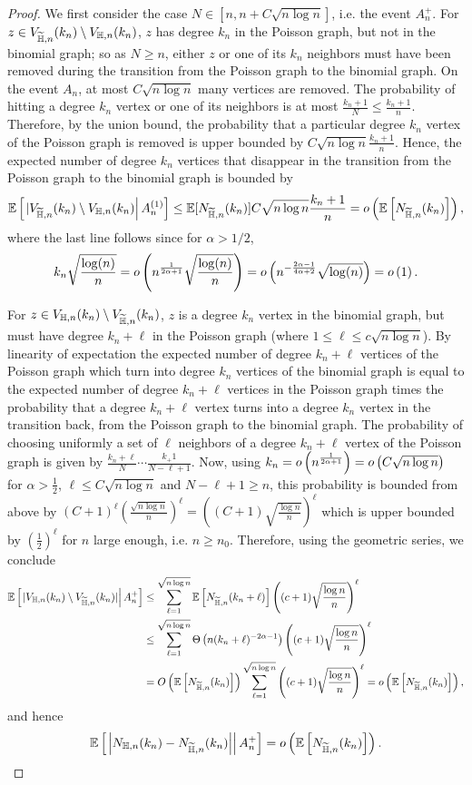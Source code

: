 \begin{proof}
We first consider the case $N \in [n,n+C\sqrt{n\log n}]$, i.e. the event $A_n^{+}$. For $z \in V_{\widetilde{\mathbb{H}},n}(k_n) \setminus V_{\mathbb{H},n}(k_n)$, $z$ has degree $k_n$ in the Poisson graph, but not in the binomial graph; so as $N \geq n$, either $z$ or one of its $k_n$ neighbors must have been removed during the transition from the Poisson graph to the binomial graph. On the event $A_n$, at most $C\sqrt{n\log n}$ many vertices are removed. The probability of hitting a degree $k_n$ vertex or one of its neighbors is at most $\frac{k_n+1}{N} \leq \frac{k_n+1}{n}$. Therefore, by the union bound, the probability that a particular degree $k_n$ vertex of the Poisson graph is removed is upper bounded by $C\sqrt{n\log n}\frac{k_n+1}{n}$. Hence, the expected number of degree $k_n$ vertices that disappear in the transition from the Poisson graph to the binomial graph is bounded by 
\[
	\mathbb{E}\left[\left.|V_{\widetilde{\mathbb{H}},n}(k_n) \setminus V_{\mathbb{H},n}(k_n)\right|A_n^{(1)}\right]\leq \mathbb{E}[N_{\widetilde{\mathbb{H}},n}(k_n)] C\sqrt{n \log n}\frac{k_n+1}{n}  
	= o\left(\mathbb{E}\left[N_{\widetilde{\mathbb{H}},n}(k_n)\right]\right),
\] 
where the last line follows since for $\alpha > 1/2$,
\[
	k_n \sqrt{\frac{\log(n)}{n}} = o\left(n^{\frac{1}{2\alpha + 1}}\sqrt{\frac{\log(n)}{n}}\right) 
	= o\left(n^{-\frac{2\alpha - 1}{4\alpha + 2}} \sqrt{\log(n)}\right) = o\left(1\right).
\]

For $z \in V_{\mathbb{H},n}(k_n) \setminus V_{\widetilde{\mathbb{H}},n}(k_n)$, $z$ is a degree $k_n$ vertex in the binomial graph, but 
must have degree $k_n+\ell$ in the Poisson graph (where $1 \leq \ell \leq c\sqrt{n\log n}$). By linearity of expectation the expected number of degree $k_n+\ell$ vertices of the Poisson graph which turn into degree $k_n$ vertices of the binomial graph is equal to the expected number of degree $k_n+\ell$ vertices in the Poisson graph times the probability that a degree $k_n+\ell$ vertex turns into a degree $k_n$ vertex in the transition back, from the Poisson graph to the binomial graph. The probability of choosing uniformly a set of $\ell$ neighbors of a degree $k_n+\ell$ vertex of the Poisson graph is given by $\frac{k_n+\ell}{N}\cdots \frac{k_+1}{N-\ell + 1}$. Now, using $k_n = o\left(n^{\frac{1}{2\alpha+1}}\right) = o\left(C\sqrt{n\log n}\right)$ for $\alpha > \frac{1}{2}$, $\ell \leq C\sqrt{n \log n}$ and $N-\ell + 1 \geq n$, this probability is bounded from above by $(C+1)^\ell (\frac{\sqrt{n \log n}}{n})^\ell =((C+1) \sqrt{\frac{\log n}{n}})^\ell$ which is upper bounded by $(\frac{1}{2})^\ell$ for $n$ large enough, i.e. $n \geq n_0$. Therefore, using the geometric series, we conclude
\begin{align*}
\mathbb{E}\left[\left.|V_{\mathbb{H},n}(k_n) \setminus V_{\widetilde{\mathbb{H}},n}(k_n)|\right|A_n^{+}\right] 
&\le  \sum_{\ell=1}^{\sqrt{n\log n}} \mathbb{E}\left[N_{\widetilde{\mathbb{H}},n}(k_n+\ell)\right] \left((c+1)\sqrt{\frac{\log n}{n}}\right)^{\ell}\\
&\le \sum_{\ell=1}^{\sqrt{n\log n}} \Theta\left(n (k_n+\ell)^{-2\alpha-1}\right) \left((c+1)\sqrt{\frac{\log n}{n}}\right)^{\ell}\\
&= O\left(\mathbb{E}\left[N_{\widetilde{\mathbb{H}},n}(k_n)\right]\right) \sum_{\ell=1}^{\sqrt{n\log n}} \left((c+1)\sqrt{\frac{\log n}{n}}\right)^{\ell}
= o\left(\mathbb{E}\left[N_{\widetilde{\mathbb{H}},n}(k_n)\right]\right),
\end{align*}
and hence
\[
	\mathbb{E}\left[\left.\left|N_{\mathbb{H},n}(k_n)-N_{\widetilde{\mathbb{H}},n}(k_n)\right|\right|A_n^{+}\right] = o\left(\mathbb{E}\left[N_{\widetilde{\mathbb{H}},n}(k_n)\right]\right).
\]


\end{proof}
